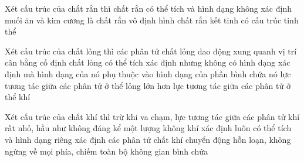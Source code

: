 \begin{ex}
	Xét cấu trúc của chất rắn thì
{chất rắn có thể tích và hình dạng không xác định}
{muối ăn và kim cương là chất rắn vô định hình}
{chất rắn kết tinh có cấu trúc tinh thể}
	\end{ex}

\begin{ex}
	Xét cấu trúc của chất lỏng thì
{các phân tử chất lỏng dao động xung quanh vị trí cân bằng cố định}
{chất lỏng có thể tích xác định nhưng không có hình dạng xác định mà hình dạng của nó phụ thuộc vào hình dạng của phần bình chứa nó}
{lực tương tác giữa các phân tử ở thể lỏng lớn hơn lực tương tác giữa các phân tử ở thể khí}
	\end{ex}

\begin{ex}
	Xét cấu trúc của chất khí thì
{trừ khi va chạm, lực tương tác giữa các phân tử khí rất nhỏ, hầu như không đáng kể}
{một lượng không khí xác định luôn có thể tích và hình dạng riêng xác định}
{các phân tử chất khí chuyển động hỗn loạn, không ngừng về mọi phía, chiếm toàn bộ không gian bình chứa}
	\end{ex}



